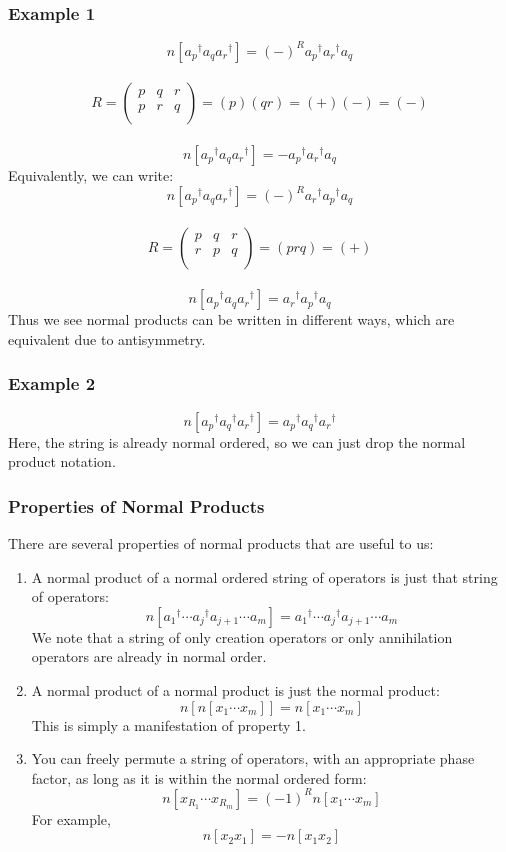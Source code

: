 \documentclass{article}
\newcommand{\dg}{\ensuremath{^\dagger} }
\newcommand{\cd}{\ensuremath{\cdots} }
\begin{document}
\subsubsection{Example 1}
\[n[a_p\dg a_q a_r \dg] = (-)^R a_p\dg a_r\dg a_q \]\\
\[
R = 
\begin{pmatrix}
p & q & r  \\
p & r & q  \\
\end{pmatrix}
= (p)(qr) = (+)(-) = (-)
\] \\
\[n[a_p\dg a_q a_r \dg] = - a_p\dg a_r\dg a_q \]
Equivalently, we can write: 
\[n[a_p\dg a_q a_r\dg ] = (-)^R a_r\dg a_p\dg a_q \]\\
\[
R = 
\begin{pmatrix}
p & q & r  \\
r & p & q  \\
\end{pmatrix}
= (prq) = (+) 
\] \\
\[n[a_p\dg a_q a_r\dg ] =  a_r\dg a_p\dg a_q \]
Thus we see normal products can be written in different ways, which are equivalent due to antisymmetry.
\subsubsection{Example 2}
\[ n[a_p\dg a_q\dg a_r\dg] = a_p\dg a_q\dg a_r\dg \]
Here, the string is already normal ordered, so we can just drop the normal product notation. 
\subsubsection{Properties of Normal Products}
There are several properties of normal products that are useful to us: 
\begin{enumerate}
\item A normal product of a normal ordered string of operators is just that string of operators:
\[n[a_{1}\dg \cd a_{j}\dg a_{j+1} \cd a_{m} ] = a_{1}\dg \cd a_{j}\dg a_{{j+1}} \cd a_{m}  \]
We note that a string of only creation operators or only annihilation operators are already in normal order. 
\item A normal product of a normal product is just the normal product: 
\[n[n[x_1 \cd x_m]] = n[x_1 \cd x_m] \]
This is simply a manifestation of property 1. 
\item You can freely permute a string of operators, with an appropriate phase factor, as long as it is within the normal ordered form:
\[n[x_{R_1} \cd x_{R_m} ] = (-1)^R n[ x_1 \cd x_m]\]
For example,
\[n[x_2 x_1] = -n[x_1 x_2] \]
\end{enumerate}
\end{document}
